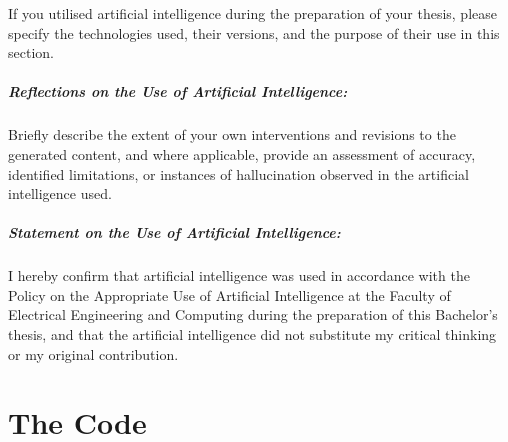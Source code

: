 \documentclass[bachelorthesis]{fer}
\begin{document}




\begin{statementonai}

  If you utilised artificial intelligence during the preparation of your thesis,
  please specify the technologies used, their versions, and the purpose of their use in this section.

  \paragraph{Reflections on the Use of Artificial Intelligence:}
  Briefly describe the extent of your own interventions and revisions to the generated content, and where applicable,
  provide an assessment of accuracy, identified limitations, or instances of hallucination observed in the artificial intelligence used.

  \paragraph{Statement on the Use of Artificial Intelligence:}
  I hereby confirm that artificial intelligence was used in accordance with
  the Policy on the Appropriate Use of Artificial Intelligence at the Faculty of Electrical Engineering and Computing
  during the preparation of this Bachelor's thesis,
  and that the artificial intelligence did not substitute my critical thinking or my original contribution.

\end{statementonai}



\backmatter

\chapter{The Code}

\Blindtext
\end{document}
